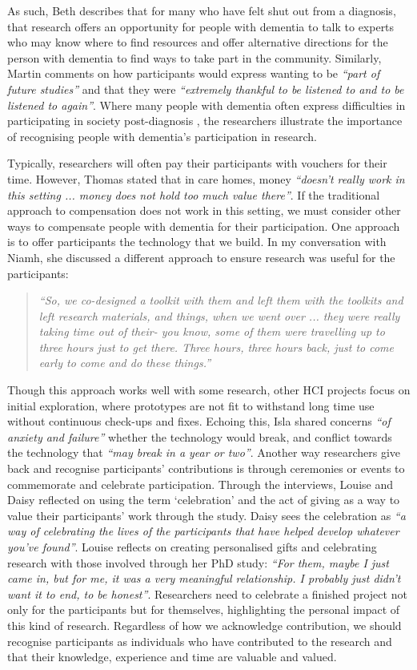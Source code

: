 As such, Beth describes that for many who have felt shut out from a diagnosis, that research offers an opportunity for people with dementia to talk to experts who may know where to find resources and offer alternative directions for the person with dementia to find ways to take part in the community. Similarly, Martin comments on how participants would express wanting to be \textit{``part of future studies''} and that they were \textit{``extremely thankful to be listened to and to be listened to again''}. Where many people with dementia often express difficulties in participating in society post-diagnosis \citep{bartlett_citizenship_2014}, the researchers illustrate the importance of recognising people with dementia's participation in research.

Typically, researchers will often pay their participants with vouchers for their time. However, Thomas stated that in care homes, money \textit{``doesn’t really work in this setting ... money does not hold too much value there''}. If the traditional approach to compensation does not work in this setting, we must consider other ways to compensate people with dementia for their participation. One approach is to offer participants the technology that we build. In my conversation with Niamh, she discussed a different approach to ensure research was useful for the participants:
\begin{quote}
    \textit{``So, we co-designed a toolkit with them and left them with the toolkits and left research materials, and things, when we went over ... they were really taking time out of their- you know, some of them were travelling up to three hours just to get there. Three hours, three hours back, just to come early to come and do these things.''}
\end{quote}

Though this approach works well with some research, other HCI projects focus on initial exploration, where prototypes are not fit to withstand long time use without continuous check-ups and fixes. Echoing this, Isla shared concerns \textit{``of anxiety and failure''} whether the technology would break, and conflict towards the technology that \textit{``may break in a year or two''}. Another way researchers give back and recognise participants' contributions is through ceremonies or events to commemorate and celebrate participation. Through the interviews, Louise and Daisy reflected on using the term `celebration' and the act of giving as a way to value their participants' work through the study. Daisy sees the celebration as \textit{``a way of celebrating the lives of the participants that have helped develop whatever you’ve found''}. Louise reflects on creating personalised gifts and celebrating research with those involved through her PhD study: \textit{``For them, maybe I just came in, but for me, it was a very meaningful relationship. I probably just didn’t want it to end, to be honest''}. Researchers need to celebrate a finished project not only for the participants but for themselves, highlighting the personal impact of this kind of research. Regardless of how we acknowledge contribution, we should recognise participants as individuals who have contributed to the research and that their knowledge, experience and time are valuable and valued.

